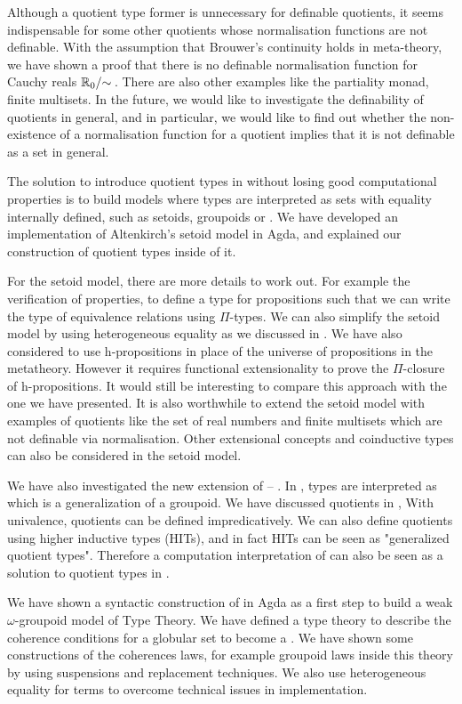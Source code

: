 Although a quotient type former is unnecessary for definable quotients, it seems indispensable for some other quotients whose normalisation functions are not definable. With the assumption that Brouwer's continuity holds in meta-theory, we have shown a proof that there is no definable normalisation function for Cauchy reals $\qset{\R_{0}}$. There are also other examples like the partiality monad, finite multisets. 
In the future, we would like to investigate the definability of quotients in general, and in particular, we would like to find out whether the non-existence of a normalisation function for a quotient implies that it is not definable as a set in general.


The solution to introduce quotient types in \itt without losing good computational properties is to build models where types are interpreted as sets with equality internally defined, such as setoids, groupoids or \wog. We have developed an implementation of Altenkirch's setoid model in Agda, and explained 
 our construction of quotient types inside of it.


For the setoid model, there are more details to work out. For example the verification of properties, to define a type for propositions such that we can write the type of equivalence relations using $\Pi$-types. We can also simplify the setoid model by using heterogeneous equality as we discussed in . We have also considered to use h-propositions in place of the universe of propositions in the metatheory. However it requires functional extensionality to prove the $\Pi$-closure of h-propositions. It would still be interesting to compare this approach with the one we have presented. It is also worthwhile to extend the setoid model with examples of quotients like the set of real numbers and finite multisets which are not definable via normalisation. 
Other extensional concepts and coinductive types can also be considered in the setoid model.


We have also investigated the new extension of \mltt --  \hott. In \hott, types are interpreted as \wog which is a generalization of a groupoid. We have discussed quotients in \hott, With univalence, quotients can be defined impredicatively. We can also define quotients using higher inductive types (HITs), and in fact HITs can be seen as "generalized quotient types".
Therefore a computation interpretation of \hott can also be seen as a solution to quotient types in \itt. 

We have shown a syntactic construction of \wog in Agda as a first step to build a weak $\omega$-groupoid model of Type Theory. We have defined a type theory \tig to describe the coherence conditions for a globular set to become a \wogs. We have shown some constructions of the coherences laws, for example groupoid laws inside this theory by using suspensions and replacement techniques. We also use heterogeneous equality for terms to overcome technical issues in implementation.

